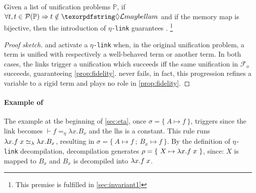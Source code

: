 \documentclass[sigconf,natbib=false,review]{acmart}
\newcommand{\appsep}{\ensuremath{\textcolor{lightgray}{\cdot}}}
\newcommand{\UnifRel}{\ensuremath{\simeq}}
\newcommand{\Ue}{\ensuremath{\UnifRel_\lambda}\xspace}
\newcommand{\linkMacro}[1]{\ensuremath{#1}\texttt{-link}\xspace}
\newcommand{\linketa} {\linkMacro{\eta}}
\newcommand{\Fo}{\texorpdfstring{\ensuremath{\mathcal{F}_{\!o}\xspace}}{Fo}} %
\newcommand{\linketaM}[3]{\ensuremath{#1 \vdash #2 =_\eta #3}}
\newcommand{\lhs}{lhs\xspace}
\newcommand{\foUnifPb}{\ensuremath{\mathbb{P}}\xspace}
\begin{document}
\begin{theorem}
  Given a list of unification problems \foUnifPb, if 
  $\forall t, t\in\subterm{\foUnifPb} \Rightarrow t \notin \notllambda$ and if the 
  memory map is bijective, then
  the introduction 
  of \linketa guarantees .
  \footnote{This premise is fulfilled in \cref{sec:invariant1}}
  \label{lemma:fidelity-maybeeta}
\end{theorem}

\begin{proof}[Proof sketch]
  \progressetaleft and \progressetadedup activate a \linketa when, in the
  original unification problem, a \maybeeta term is unified with respectively a
  well-behaved term or another \maybeeta term. In both cases, the links trigger
  a unification which succeeds iff the same unification in \Fo{} succeeds,
  guaranteeing \cref{prop:fidelity}. \progressetaright never fails, in fact,
  this progression refines a variable to a rigid term and plays no role in 
  \cref{prop:fidelity}.
\end{proof}

\paragraph{Example of \progressetaleft}

The example at the beginning of \cref{sec:eta}, once
$\sigma = \{~ A \mapsto f ~\}$, triggers \progressetaleft since the link
becomes \linketaM{}{f}{\lambda x.B_{x}} and the \lhs is a constant.
This rule runs $\lambda x.f \appsep x \Ue{} \lambda x.B_{x}$,
resulting in $\sigma = \{~ A \mapsto f ~;~ B_{x} \mapsto f ~\}$.
By the definition of \linketa decompilation,
decompilation generates $\rho = \{~ X \mapsto \lambda x. f \appsep x ~\}$, since:
$X$ is mapped to $B_x$ and $B_x$ is decompiled into $\lambda x.f \appsep x$.
\end{document}
